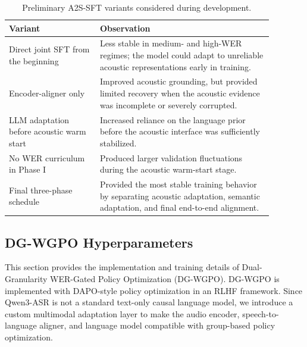 \documentclass{llmxive}
\providecommand{\arraystretch}{1.05}
\begin{document}
\begin{table}[t]
\centering
\small
\renewcommand{\arraystretch}{1.12}
\begin{tabular}{p{0.30\linewidth} p{0.58\linewidth}}
\toprule
\textbf{Variant} & \textbf{Observation} \\
\midrule

Direct joint SFT from the beginning
& Less stable in medium- and high-WER regimes; the model could adapt to
unreliable acoustic representations early in training. \\

Encoder-aligner only
& Improved acoustic grounding, but provided limited recovery when the acoustic
evidence was incomplete or severely corrupted. \\

LLM adaptation before acoustic warm start
& Increased reliance on the language prior before the acoustic interface was
sufficiently stabilized. \\

No WER curriculum in Phase I
& Produced larger validation fluctuations during the acoustic warm-start stage. \\

Final three-phase schedule
& Provided the most stable training behavior by separating acoustic adaptation,
semantic adaptation, and final end-to-end alignment. \\
\bottomrule
\end{tabular}
\vspace{-2mm}
\caption{
Preliminary A2S-SFT variants considered during development.
}
\label{tab:a2s_sft_variants}
\end{table}

\subsection{DG-WGPO Hyperparameters}
\label{app:dg_wgpo_hparams}

This section provides the implementation and training details of
Dual-Granularity WER-Gated Policy Optimization (DG-WGPO). DG-WGPO is implemented
with DAPO-style policy optimization in an RLHF framework. Since Qwen3-ASR is not a
standard text-only causal language model, we introduce a custom multimodal
adaptation layer to make the audio encoder, speech-to-language aligner, and
language model compatible with group-based policy optimization.
\end{document}
